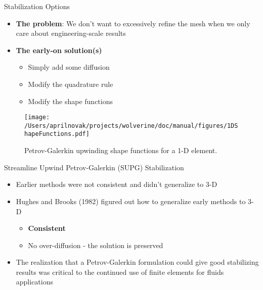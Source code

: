 \documentclass{beamer}
\begin{document}

\begin{frame}{Stabilization Options}

\begin{itemize}
\item \textbf{The problem}: We don't want to excessively refine the mesh when we only care about engineering-scale results
\item \textbf{The early-on solution(s)}
	\begin{itemize}
		\item Simply add some diffusion
		\item Modify the quadrature rule
		\item Modify the shape functions
	\end{itemize}
\end{itemize}

\begin{figure}[H]
  \centering
  \texttt{[image: /Users/aprilnovak/projects/wolverine/doc/manual/figures/1DShapeFunctions.pdf]}
  \caption{Petrov-Galerkin upwinding shape functions for a 1-D element.}
\end{figure}

\end{frame}


\begin{frame}{Streamline Upwind Petrov-Galerkin (SUPG) Stabilization}

\begin{itemize}
\item Earlier methods were not consistent and didn't generalize to 3-D
\item Hughes and Brooks (1982) figured out how to generalize early methods to 3-D
	\begin{itemize}
		\item \textbf{Consistent}
		\item No over-diffusion - the solution is preserved
	\end{itemize}
\item The realization that a Petrov-Galerkin formulation could give good stabilizing results was critical to the continued use of finite elements for fluids applications
\end{itemize}

\end{frame}
\end{document}
